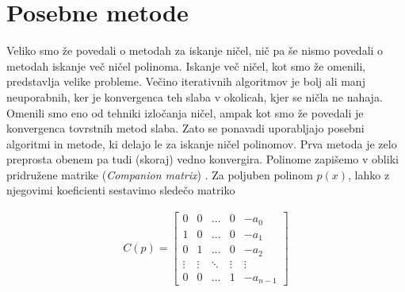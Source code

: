 \section{Posebne metode}
Veliko smo že povedali o metodah za iskanje ničel, nič pa še nismo povedali o metodah iskanje več ničel polinoma. Iskanje več ničel, kot smo že omenili, predstavlja velike probleme. Večino iterativnih algoritmov je bolj ali manj neuporabnih, ker je konvergenca teh slaba v okolicah, kjer se ničla ne nahaja. Omenili smo eno od tehniki izločanja ničel, ampak kot smo že povedali je konvergenca tovrstnih metod slaba. Zato se ponavadi uporabljajo posebni algoritmi in metode, ki delajo le za iskanje ničel polinomov. Prva metoda je zelo preprosta obenem pa tudi (skoraj) vedno konvergira. Polinome zapišemo v obliki pridružene matrike (\textit{Companion matrix}) \cite{Plestenjak2010}. Za poljuben polinom $p(x)$, lahko z njegovimi koeficienti sestavimo sledečo matriko

\begin{align}
    C(p)={\begin{bmatrix}0&0&\dots &0&-a_{0}\\1&0&\dots &0&-a_{1}\\0&1&\dots &0&-a_{2}\\\vdots &\vdots &\ddots &\vdots &\vdots \\0&0&\dots &1&-a_{n-1}\end{bmatrix}}
\end{align}

